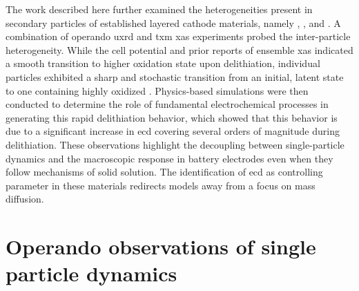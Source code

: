 \documentclass{article}
\begin{document}
The work described here further examined the heterogeneities present
in secondary particles of established layered cathode materials,
namely \nca{}, \nmc[333]{}, and \nmc[532]{}. A combination of operando
\gls{uxrd} and \gls{txm} \gls{xas} experiments probed the
inter-particle heterogeneity. While the cell potential and prior
reports of ensemble \gls{xas} indicated a smooth transition to higher
oxidation state upon delithiation\cite{deb2005,muto2009}, individual
particles exhibited a sharp and stochastic transition from an initial,
latent state to one containing highly oxidized . Physics-based
simulations were then conducted to determine the role of fundamental
electrochemical processes in generating this rapid delithiation
behavior, which showed that this behavior is due to a significant
increase in \gls{ecd} covering several orders of magnitude during
delithiation. These observations highlight the decoupling between
single-particle dynamics and the macroscopic response in battery
electrodes even when they follow mechanisms of solid solution. The
identification of \gls{ecd} as controlling parameter in these
materials redirects models away from a focus on mass diffusion.

\section{Operando observations of single particle dynamics}

\end{document}

